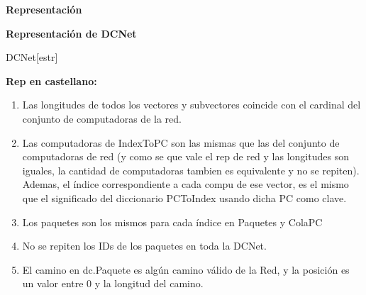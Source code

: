 \documentclass[a4paper,10pt]{article}
\newenvironment{Representacion}{%
  \vspace*{2ex}%
  \noindent\textbf{\Large Representación}%
  \vspace*{2ex}%
}{}
\begin{document}
\begin{Representacion}

\textbf{Representación de DCNet}

  \begin{Estructura}{DCNet}[estr]
    \begin{Tupla}[estr]
    \end{Tupla}
  \end{Estructura}	
 
 \textbf{Rep en castellano:}
  \begin{enumerate}
  \item Las longitudes de todos los vectores y subvectores coincide con el cardinal del conjunto de computadoras de la red.
  \item Las computadoras de IndexToPC son las mismas que las del conjunto de computadoras de red (y como se que vale el rep de red y las longitudes son iguales, la cantidad de computadoras tambien es equivalente y no se repiten). Ademas, el índice correspondiente a cada compu de ese vector, es el mismo que el significado del diccionario PCToIndex usando dicha PC como clave.
  \item Los paquetes son los mismos para cada índice en Paquetes y ColaPC
  \item No se repiten los IDs de los paquetes en toda la DCNet.
  \item El camino en dc.Paquete es algún camino válido de la Red, y la posición es un valor entre 0 y la longitud del camino.
  \end{enumerate}
  
  \newpage
\end{Representacion}
\end{document}
